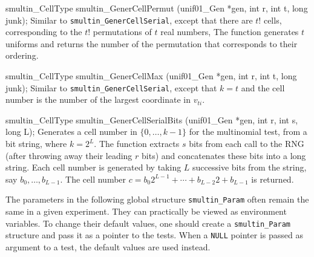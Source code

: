 smultin_CellType smultin_GenerCellPermut (unif01_Gen *gen, int r, int t,
                                          long junk);
\endcode
 \tab Similar to {\tt smultin\_GenerCellSerial}, except that there are
  $t!$ cells, corresponding to the $t!$ permutations of $t$ real numbers,
  The function generates $t$ uniforms and returns the number of the
  permutation that corresponds to their ordering.
 \endtab
\code


smultin_CellType smultin_GenerCellMax (unif01_Gen *gen, int r, int t,
                                       long junk);
\endcode
 \tab  Similar to {\tt smultin\_GenerCellSerial}, except that $k=t$
  and the cell number is the number of the largest coordinate in $v_{ti}$.
 \endtab
\hide
\code


smultin_CellType smultin_GenerCellSerialBits (unif01_Gen *gen, int r, int s,
                                              long L);
\endcode
 \tab  Generates a cell number in $\{0,\dots,k-1\}$ for the
  multinomial test, from a bit string, where $k = 2^L$.
  The function extracts $s$ bits from each call to the RNG
  (after throwing away their leading $r$ bits)
  and concatenates these bits into a long string.
  Each cell number is generated by taking $L$ successive bits from
  the string, say $b_0,\dots,b_{L-1}$.
  The cell number $c = b_0 2^{L-1} + \cdots + b_{L-2} 2 + b_{L-1}$
  is returned.
 \endtab
\endhide

\nopagebreak

The parameters in the following global structure {\tt smultin\_Param}
often remain the same in a given experiment.
They can practically be viewed as environment variables.
To change their default values, one should create a {\tt smultin\_Param}
structure and pass it as a pointer to the tests.
When a {\tt NULL} pointer is passed as argument to a test, the
default values are used instead.

\code


